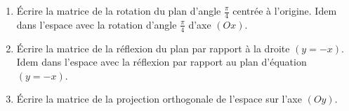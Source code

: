 \begin{frame}
\begin{miniexercice}
\begin{enumerate}
  
  \item \'Ecrire la matrice de la rotation du plan d'angle $\frac\pi4$ centrée à l'origine.
 Idem dans l'espace avec la rotation d'angle $\frac\pi4$ d'axe $(Ox)$.
  
  \item \'Ecrire la matrice de la réflexion du plan par rapport à la droite $(y=-x)$.
 Idem dans l'espace avec la réflexion par rapport au plan d'équation $(y=-x)$.
 
 \item\'Ecrire la matrice de la projection orthogonale de l'espace sur l'axe $(Oy)$.
 
\end{enumerate}
\end{miniexercice}
\end{frame}


